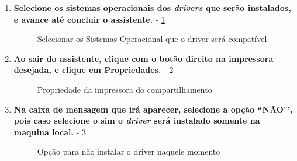 \begin{enumerate}
	
	\item \textbf{Selecione os sistemas operacionais dos \textit{drivers} que serão instalados, e avance até concluir o assistente.} - \ref{selecionar_so}
	\begin{figure}[ht]
	   	\centering
	   	\caption{Selecionar os Sistemas Operacional que o driver será compatível}
	    \label{selecionar_so}
	\end{figure}
	
	\pagebreak
	
	\item \textbf{Ao sair do assistente, clique com o botão direito na impressora desejada, e clique em Propriedades.} - \ref{propriedade_impressora}
	\begin{figure}[ht]
	   	\centering
	   	\caption{Propriedade da impressora do compartilhamento}
	    \label{propriedade_impressora}
	\end{figure}

	
	\item \textbf{Na caixa de mensagem que irá aparecer, selecione a opção ``NÃO"', pois caso selecione o sim o \textit{driver} será instalado somente na maquina local.} - \ref{opcao_nao}
	\begin{figure}[ht]
	   	\centering
	   	\caption{Opção para não instalar o driver naquele momento}
	    \label{opcao_nao}
	\end{figure}
	

\end{enumerate}
